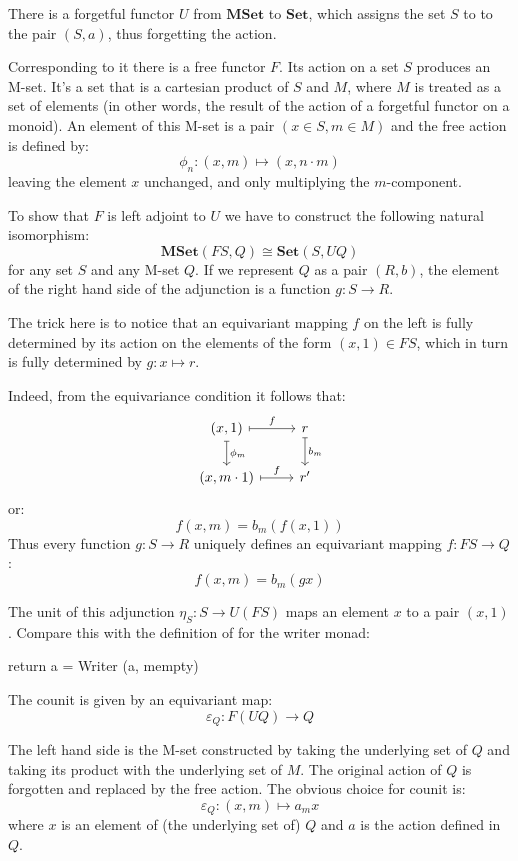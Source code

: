 \documentclass[DaoFP]{subfiles}
\begin{document}
There is a forgetful functor $U$ from $\mathbf{MSet}$ to $\mathbf{Set}$, which assigns the set $S$ to to the pair $(S, a)$, thus forgetting the action.  

Corresponding to it there is a free functor $F$. Its action on a set $S$ produces an M-set. It's a set that is a cartesian product of $S$ and $M$, where $M$ is treated as a set of elements (in other words, the result of the action of a forgetful functor on a monoid). An element of this M-set is a pair $(x \in S, m \in M)$ and the free action is defined by:
\[ \phi_n \colon (x, m) \mapsto (x, n \cdot m) \]
leaving the element $x$ unchanged, and only multiplying the $m$-component.

To show that $F$ is left adjoint to $U$ we have to construct the following natural isomorphism:
\[ \mathbf{MSet}( F S, Q) \cong \mathbf{Set}(S, U Q) \]
for any set $S$ and any M-set $Q$. If we represent $Q$ as a pair $(R, b)$, the element of the right hand side of the adjunction is a function $g \colon S \to R$. 

The trick here is to notice that an equivariant mapping $f$ on the left is fully determined by its action on the elements of the form $(x, 1) \in F S$, which in turn is fully determined by $g \colon x \mapsto r$. 

Indeed, from the equivariance condition it follows that:
\[
 \begin{tikzcd}
 (x, 1)
 \arrow[r, mapsto, "f"]
 \arrow[d, mapsto, "\phi_m"]
 & r
\arrow[d, mapsto, "b_m"]
 \\
(x, m \cdot 1)
 \arrow[r, mapsto, "f"]
 & r'
  \end{tikzcd}
\]
or:
\[ f (x, m) = b_m ( f (x, 1)) \]
Thus every function $g \colon S \to R$ uniquely defines an equivariant mapping $f \colon F S \to Q$:
\[ f (x, m) = b_m (g x) \]

The unit of this adjunction $\eta_S \colon S \to U (F S)$ maps an element $x$ to a pair $(x, 1)$. Compare this with the definition of  for the writer monad:
\begin{haskell}
return a = Writer (a, mempty)
\end{haskell}

The counit is given by an equivariant map:
\[ \varepsilon_Q \colon F (U Q) \to Q \]

The left hand side is the M-set constructed by taking the underlying set of $Q$ and taking its product with the underlying set of $M$. The original action of $Q$ is forgotten and replaced by the free action. The obvious choice for counit is:
\[ \varepsilon_Q \colon (x, m) \mapsto a_m x \]
where $x$ is an element of (the underlying set of) $Q$ and $a$ is the action defined in $Q$.
\end{document}
